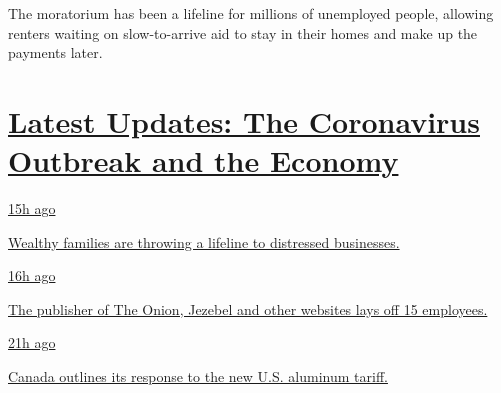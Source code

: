 The moratorium has been a lifeline for millions of unemployed people,
allowing renters waiting on slow-to-arrive aid to stay in their homes
and make up the payments later.

\hypertarget{latest-updates-the-coronavirus-outbreak-and-the-economy}{%
\section{\texorpdfstring{\href{https://www.nytimes.com/live/2020/08/07/business/stock-market-today-coronavirus?action=click\&pgtype=Article\&state=default\&region=MAIN_CONTENT_1\&context=storylines_live_updates}{Latest
Updates: The Coronavirus Outbreak and the
Economy}}{Latest Updates: The Coronavirus Outbreak and the Economy}}\label{latest-updates-the-coronavirus-outbreak-and-the-economy}}

\href{https://www.nytimes.com/live/2020/08/07/business/stock-market-today-coronavirus?action=click\&pgtype=Article\&state=default\&region=MAIN_CONTENT_1\&context=storylines_live_updates\#wealthy-families-are-throwing-a-lifeline-to-distressed-businesses}{15h
ago}

\href{https://www.nytimes.com/live/2020/08/07/business/stock-market-today-coronavirus?action=click\&pgtype=Article\&state=default\&region=MAIN_CONTENT_1\&context=storylines_live_updates\#wealthy-families-are-throwing-a-lifeline-to-distressed-businesses}{Wealthy
families are throwing a lifeline to distressed businesses.}

\href{https://www.nytimes.com/live/2020/08/07/business/stock-market-today-coronavirus?action=click\&pgtype=Article\&state=default\&region=MAIN_CONTENT_1\&context=storylines_live_updates\#the-publisher-of-the-onion-jezebel-and-other-websites-lays-off-15-employees}{16h
ago}

\href{https://www.nytimes.com/live/2020/08/07/business/stock-market-today-coronavirus?action=click\&pgtype=Article\&state=default\&region=MAIN_CONTENT_1\&context=storylines_live_updates\#the-publisher-of-the-onion-jezebel-and-other-websites-lays-off-15-employees}{The
publisher of The Onion, Jezebel and other websites lays off 15
employees.}

\href{https://www.nytimes.com/live/2020/08/07/business/stock-market-today-coronavirus?action=click\&pgtype=Article\&state=default\&region=MAIN_CONTENT_1\&context=storylines_live_updates\#canada-outlines-its-response-to-the-new-us-aluminum-tariff}{21h
ago}

\href{https://www.nytimes.com/live/2020/08/07/business/stock-market-today-coronavirus?action=click\&pgtype=Article\&state=default\&region=MAIN_CONTENT_1\&context=storylines_live_updates\#canada-outlines-its-response-to-the-new-us-aluminum-tariff}{Canada
outlines its response to the new U.S. aluminum tariff.}

